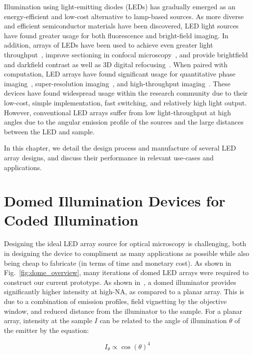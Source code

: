 Illumination using light-emitting diodes (LEDs) has gradually emerged as an energy-efficient and low-cost alternative to lamp-based sources. As more diverse and efficient semiconductor materials have been discovered, LED light sources have found greater usage for both fluorescence and bright-field imaging. In addition, arrays of LEDs have been used to achieve even greater light throughput~\cite{albeanu2008led}, improve sectioning in confocal microscopy~\cite{poher2007optical}, and provide brightfield and darkfield contrast as well as 3D digital refocusing~\cite{Zheng2011}. When paired with computation, LED arrays have found significant usage for quantitative phase imaging~\cite{tian2015quantitative, phillips2015multi, chen2018quantitative}, super-resolution imaging~\cite{Zheng2013, Tian2014}, and high-throughput imaging~\cite{Ma:15}. These devices have found widespread usage within the research community due to their low-cost, simple implementation, fast switching, and relatively high light output. However, conventional LED arrays suffer from low light-throughput at high angles due to the angular emission profile of the sources and the large distances between the LED and sample.

In this chapter, we detail the design process and manufacture of several LED array designs, and discuss their performance in relevant use-cases and applications.

\section{Domed Illumination Devices for Coded Illumination}

Designing the ideal LED array source for optical microscopy is challenging, both in designing the device to compliment as many applications as possible while also being cheap to fabricate (in terms of time and monetary cost). As shown in Fig.~\ref{fig:dome_overview}, many iterations of domed LED arrays were required to construct our current prototype. As shown in~\cite{phillips2015multi, Dominguez:14}, a domed illuminator provides significantly higher intensity at high-NA, as compared to a planar array. This is due to a combination of emission profiles, field vignetting by the objective window, and reduced distance from the illuminator to the sample. For a planar array, intensity at the sample $I$ can be related to the angle of illumination $\theta$ of the emitter by the equation:

\begin{equation}
    I_{\theta} \propto {\cos(\theta)}^4
\end{equation}

